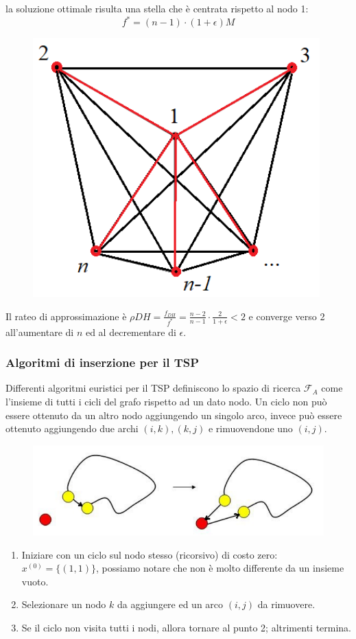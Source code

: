 \documentclass{article}
\begin{document}
la soluzione ottimale risulta una stella che è centrata rispetto al nodo 1:
$$f^* = (n-1)\cdot(1+\epsilon)M$$
\begin{figure}[H]
    \centering
    \includegraphics[scale=0.5]{images/star1.png}
\end{figure}
Il rateo di approssimazione è $\rho DH=\frac{f_{DH}}{f^*}=\frac{n-2}{n-1}\cdot\frac{2}{1+\epsilon}<2$ e converge
verso 2 all'aumentare di $n$ ed al decrementare di $\epsilon$.

\subsubsection{Algoritmi di inserzione per il TSP}
Differenti algoritmi euristici per il TSP definiscono lo spazio di ricerca $\mathcal{F}_A$ come
l'insieme di tutti i cicli del grafo rispetto ad un dato nodo. Un ciclo non può essere ottenuto
da un altro nodo aggiungendo un singolo arco, invece può essere ottenuto aggiungendo due archi
$(i,k),(k,j)$ e rimuovendone uno $(i,j)$.

\begin{figure}[H]
    \centering
    \includegraphics[scale=0.5]{images/looop.png}
\end{figure}
\begin{enumerate}
    \item Iniziare con un ciclo sul nodo stesso (ricorsivo) di costo zero: $x^{(0)}=\{(1,1)\}$,
          possiamo notare che non è molto differente da un insieme vuoto.
    \item Selezionare un nodo $k$ da aggiungere ed un arco $(i,j)$ da rimuovere.
    \item Se il ciclo non visita tutti i nodi, allora tornare al punto 2; altrimenti termina.
\end{enumerate}
\end{document}
